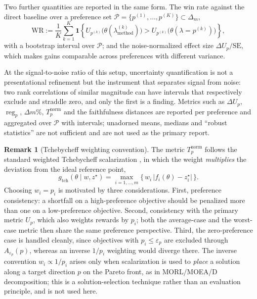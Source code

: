 \documentclass[12pt,a4paper]{report}
\newcommand{\1}{\mathbf{1}}
\DeclareMathOperator{\reg}{reg}
\theoremstyle{definition}
\newtheorem{remark}[definition]{Remark}
\begin{document}
Two further quantities are reported in the same form. The win rate against the direct baseline over a preference set \(\mathcal{P}=\{p^{(1)},\dots,p^{(K)}\}\subset\Delta_m\),
\[
\mathrm{WR}:=\frac{1}{K}\sum_{k=1}^K
\1\!\left\{U_{p^{(k)}}\bigl(\theta(\lambda_{\mathrm{method}}^{(k)})\bigr)>U_{p^{(k)}}\bigl(\theta(\lambda=p^{(k)})\bigr)\right\},
\]
with a bootstrap interval over \(\mathcal{P}\); and the noise-normalized effect size \(\Delta U_p/\mathrm{SE}\), which makes gains comparable across preferences with different variance.

At the signal-to-noise ratio of this setup, uncertainty quantification is not a presentational refinement but the instrument that separates signal from noise: two rank correlations of similar magnitude can have intervals that respectively exclude and straddle zero, and only the first is a finding. Metrics such as \(\Delta U_p\), \(\reg_p\), \(\Delta m\%\), \(T_p^{\mathrm{norm}}\) and the faithfulness distances are reported per preference and aggregated over \(\mathcal{P}\) with intervals; unadorned means, medians and ``robust statistics'' are not sufficient and are not used as the primary report.

\begin{remark}[Tchebycheff weighting convention]
\label{rem:tchebycheff-weights}
The metric \(T_p^{\mathrm{norm}}\) follows the standard weighted Tchebycheff scalarization \citep{miettinen1999nonlinear}, in which the weight \emph{multiplies} the deviation from the ideal reference point,
\[
g_{\mathrm{tch}}(\theta\mid w,z^\star)=\max_{i=1,\dots,m}\bigl\{\,w_i\,\lvert f_i(\theta)-z_i^\star\rvert\,\bigr\}.
\]
Choosing \(w_i=p_i\) is motivated by three considerations. First, preference consistency: a shortfall on a high-preference objective should be penalized more than one on a low-preference objective. Second, consistency with the primary metric \(U_p\), which also weights rewards by \(p_i\); both the average-case and the worst-case metric then share the same preference perspective. Third, the zero-preference case is handled cleanly, since objectives with \(p_i\le\varepsilon_p\) are excluded through \(A_{\varepsilon_p}(p)\), whereas an inverse \(1/p_i\) weighting would diverge there. The inverse convention \(w_i\propto 1/p_i\) arises only when scalarization is used to \emph{place} a solution along a target direction \(p\) on the Pareto front, as in MORL/MOEA/D decomposition; this is a solution-selection technique rather than an evaluation principle, and is not used here.
\end{remark}
\end{document}
